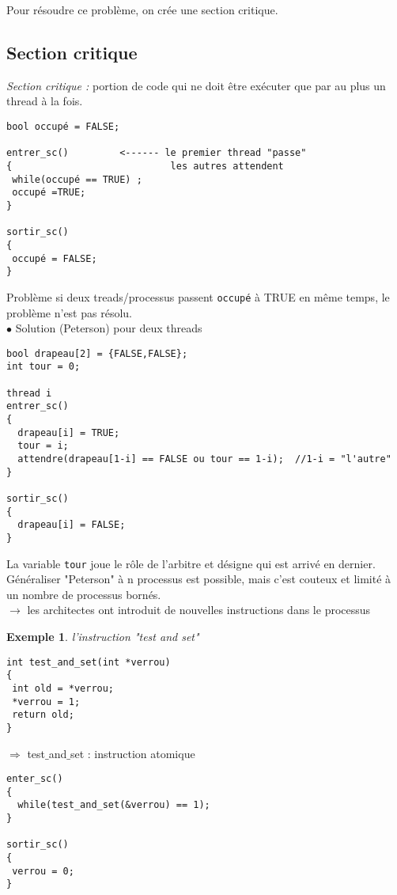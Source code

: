 \documentclass[12pt,a4paper]{report}
\newtheorem*{ex}{Exemple}
\begin{document}
Pour résoudre ce problème, on crée une section critique. \\

\subsection{Section critique}
\textit{Section critique :} portion de code qui ne doit être  exécuter que par au plus un thread à la fois.

 \medskip
\begin{verbatim}
bool occupé = FALSE;

entrer_sc()         <------ le premier thread "passe" 
{                            les autres attendent
 while(occupé == TRUE) ;
 occupé =TRUE;
}

sortir_sc()
{
 occupé = FALSE;
}
\end{verbatim}
\medskip
Problème si deux treads/processus passent \verb?occupé? à TRUE en même temps, le problème n'est pas résolu.\\


$\bullet$ Solution (Peterson) pour deux threads
\medskip
\begin{verbatim}
bool drapeau[2] = {FALSE,FALSE};
int tour = 0;

thread i
entrer_sc()
{
  drapeau[i] = TRUE;
  tour = i;
  attendre(drapeau[1-i] == FALSE ou tour == 1-i);  //1-i = "l'autre"
}

sortir_sc()
{
  drapeau[i] = FALSE;
}
\end{verbatim}
\medskip
La variable \verb?tour? joue le rôle de l'arbitre et désigne qui est arrivé en dernier.\\

Généraliser "Peterson" à n processus est possible, mais c'est couteux et limité à un nombre de processus bornés.\\
$\rightarrow$ les architectes ont introduit de nouvelles instructions dans le processus\\

\begin{ex} l'instruction "test and set"\end{ex}
\begin{verbatim}
int test_and_set(int *verrou)
{
 int old = *verrou;
 *verrou = 1;
 return old;
}
\end{verbatim}
\medskip

$\Longrightarrow$ test$\_$and$\_$set : instruction atomique

\medskip
\begin{verbatim}
enter_sc()
{
  while(test_and_set(&verrou) == 1);
}

sortir_sc()
{
 verrou = 0;
}
\end{verbatim}
\medskip
\end{document}
